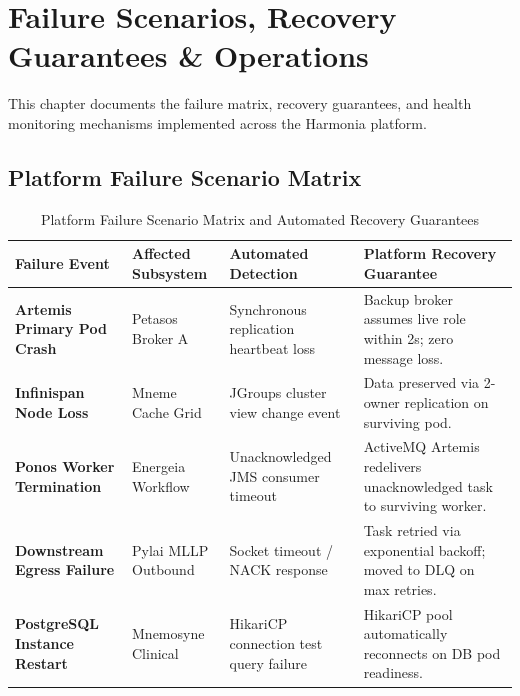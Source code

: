 
\chapter{Failure Scenarios, Recovery Guarantees \& Operations}
\label{chap:failure_operations}

This chapter documents the failure matrix, recovery guarantees, and health monitoring mechanisms implemented across the Harmonia platform.

\section{Platform Failure Scenario Matrix}

\begin{table}[htbp]
\centering
\small
\begin{tabularx}{\textwidth}{l p{3.2cm} p{3.5cm} X}
\toprule
\textbf{Failure Event} & \textbf{Affected Subsystem} & \textbf{Automated Detection} & \textbf{Platform Recovery Guarantee} \\
\midrule
\textbf{Artemis Primary Pod Crash} & Petasos Broker A & Synchronous replication heartbeat loss & Backup broker assumes live role within 2s; zero message loss. \\
\addlinespace
\textbf{Infinispan Node Loss} & Mneme Cache Grid & JGroups cluster view change event & Data preserved via 2-owner replication on surviving pod. \\
\addlinespace
\textbf{Ponos Worker Termination} & Energeia Workflow & Unacknowledged JMS consumer timeout & ActiveMQ Artemis redelivers unacknowledged task to surviving worker. \\
\addlinespace
\textbf{Downstream Egress Failure} & Pylai MLLP Outbound & Socket timeout / NACK response & Task retried via exponential backoff; moved to DLQ on max retries. \\
\addlinespace
\textbf{PostgreSQL Instance Restart} & Mnemosyne Clinical & HikariCP connection test query failure & HikariCP pool automatically reconnects on DB pod readiness. \\
\bottomrule
\end{tabularx}
\caption{Platform Failure Scenario Matrix and Automated Recovery Guarantees}
\label{tab:failure_matrix}
\end{table}

